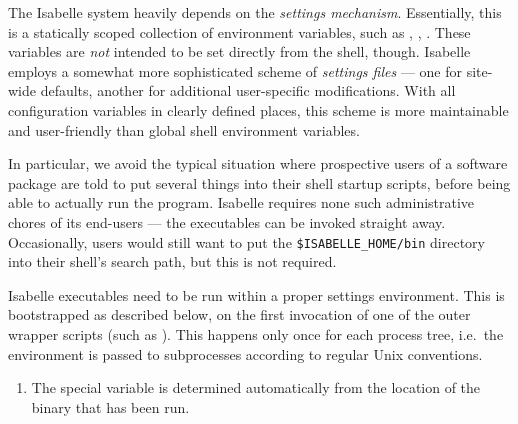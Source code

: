 \begin{isabellebody}
\begin{isamarkuptext}
\begin{enumerate}
  \end{enumerate}%
\end{isamarkuptext}%
\isamarkuptrue%
%
\isamarkuptrue%
%
\begin{isamarkuptext}%
The Isabelle system heavily depends on the \emph{settings
  mechanism}.  Essentially, this is a statically
  scoped collection of environment variables, such as \hyperlink{setting.ISABELLE-HOME}{\mbox{}}, \hyperlink{setting.ML-SYSTEM}{\mbox{}}, \hyperlink{setting.ML-HOME}{\mbox{}}.  These
  variables are \emph{not} intended to be set directly from the shell,
  though.  Isabelle employs a somewhat more sophisticated scheme of
  \emph{settings files} --- one for site-wide defaults, another for
  additional user-specific modifications.  With all configuration
  variables in clearly defined places, this scheme is more
  maintainable and user-friendly than global shell environment
  variables.

  In particular, we avoid the typical situation where prospective
  users of a software package are told to put several things into
  their shell startup scripts, before being able to actually run the
  program. Isabelle requires none such administrative chores of its
  end-users --- the executables can be invoked straight away.
  Occasionally, users would still want to put the \verb|$ISABELLE_HOME/bin| directory into their shell's search path, but
  this is not required.%
\end{isamarkuptext}%
\isamarkuptrue%
%
\isamarkuptrue%
%
\begin{isamarkuptext}%
Isabelle executables need to be run within a proper settings
  environment.  This is bootstrapped as described below, on the first
  invocation of one of the outer wrapper scripts (such as
  \hyperlink{executable.isabelle}{\mbox{}}).  This happens only once for each
  process tree, i.e.\ the environment is passed to subprocesses
  according to regular Unix conventions.

  \begin{enumerate}

  \item The special variable \hypertarget{setting.ISABELLE-HOME}{\hyperlink{setting.ISABELLE-HOME}{\mbox{}}} is
  determined automatically from the location of the binary that has
  been run.
  

\end{enumerate}
\end{isamarkuptext}
\end{isabellebody}
